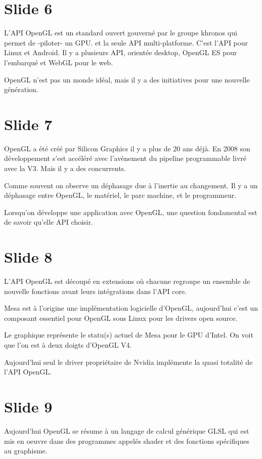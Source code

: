 \documentclass[12pt]{article}
\begin{document}
\section{Slide 6}

L'API OpenGL est un standard ouvert gouverné par le groupe khronos qui permet de -piloter- un GPU.
et la seule API multi-platforme.
C'est l'API pour Linux et Android.
Il y a plusieurs API, orientée desktop, OpenGL ES pour l'embarqué et WebGL pour le web.

OpenGL n'est pas un monde idéal, mais il y a des initiatives pour une nouvelle génération.

\section{Slide 7}

OpenGL a été créé par Silicon Graphics il y a plus de 20 ans déjà. En 2008 son développement s'est
accéléré avec l'avènement du pipeline programmable livré avec la V3. Mais il y a des concurrents.

Comme souvent on observe un déphasage due à l'inertie au changement. Il y a un déphasage entre
OpenGL, le matériel, le parc machine, et le programmeur.

Lorsqu'on développe une application avec OpenGL, une question fondamental est de savoir qu'elle API choisir.

\section{Slide 8}

L'API OpenGL est découpé en extensions où chacune regroupe un ensemble de nouvelle fonctions avant
leurs intégrations dans l'API core.

Mesa est à l'origine une implémentation logicielle d'OpenGL, aujourd'hui c'est un composant
essentiel pour OpenGL sous Linux pour les drivers open source.

Le graphique représente le statu(s) actuel de Mesa pour le GPU d'Intel.
On voit que l'on est à deux doigts d'OpenGL V4.

Aujourd'hui seul le driver propriétaire de Nvidia implémente la quasi totalité de l'API OpenGL.

\section{Slide 9}

Aujourd'hui OpenGL se résume à un langage de calcul générique GLSL qui est mis en oeuvre dans des programmes
appelés shader et des fonctions spécifiques au graphisme.
\end{document}
